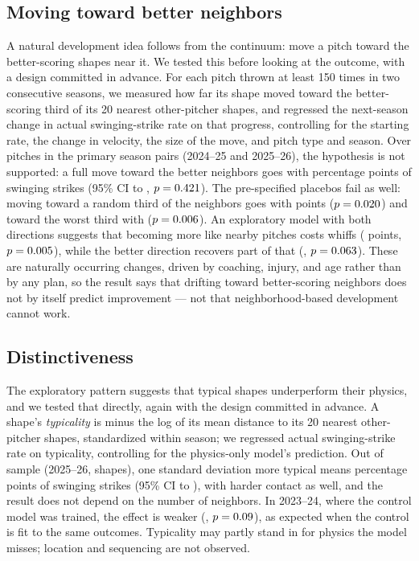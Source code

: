\documentclass{article}
\theoremstyle{definition}
\theoremstyle{remark}
\begin{document}
\subsection{Moving toward better neighbors}
A natural development idea follows from the continuum: move a pitch toward the better-scoring shapes near it.
We tested this before looking at the outcome, with a design committed in advance.
For each pitch thrown at least 150 times in two consecutive seasons, we measured how far its shape moved toward the better-scoring third of its 20 nearest other-pitcher shapes, and regressed the next-season change in actual swinging-strike rate on that progress, controlling for the starting rate, the change in velocity, the size of the move, and pitch type and season.
Over \DevN{} pitches in the primary season pairs (2024--25 and 2025--26), the hypothesis is not supported: a full move toward the better neighbors goes with \DevBetterBeta{} percentage points of swinging strikes (95\% CI \DevBetterLo{} to \DevBetterHi, $p = 0.421$).
The pre-specified placebos fail as well: moving toward a random third of the neighbors goes with \DevRandomBeta{} points ($p = 0.020$) and toward the worst third with \DevWorseBeta{} ($p = 0.006$).
An exploratory model with both directions suggests that becoming more like nearby pitches costs whiffs (\DevExRandomBeta{} points, $p = 0.005$), while the better direction recovers part of that (\DevExBetterBeta, $p = 0.063$).
These are naturally occurring changes, driven by coaching, injury, and age rather than by any plan, so the result says that drifting toward better-scoring neighbors does not by itself predict improvement --- not that neighborhood-based development cannot work.

\subsection{Distinctiveness}
The exploratory pattern suggests that typical shapes underperform their physics, and we tested that directly, again with the design committed in advance.
A shape's \emph{typicality} is minus the log of its mean distance to its 20 nearest other-pitcher shapes, standardized within season; we regressed actual swinging-strike rate on typicality, controlling for the physics-only model's prediction.
Out of sample (2025--26, \TypN{} shapes), one standard deviation more typical means \TypBeta{} percentage points of swinging strikes (95\% CI \TypLo{} to \TypHi), with harder contact as well, and the result does not depend on the number of neighbors.
In 2023--24, where the control model was trained, the effect is weaker (\TypSecBeta, $p = 0.09$), as expected when the control is fit to the same outcomes.
Typicality may partly stand in for physics the model misses; location and sequencing are not observed.
\end{document}
